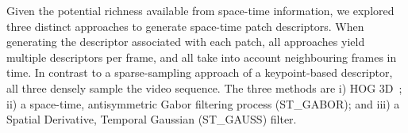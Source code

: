 

Given the potential richness available from space-time information, we explored three distinct approaches to generate space-time patch descriptors.  When generating the descriptor associated with each patch, all  approaches yield multiple descriptors per frame, and all take into account neighbouring frames in time.  In contrast to a sparse-sampling approach of a keypoint-based descriptor, all three densely sample the video sequence.  The three methods are i) HOG 3D~\cite{Klaser2008}; ii) a space-time, antisymmetric Gabor filtering process (ST\_GABOR); and iii) a Spatial Derivative, Temporal Gaussian (ST\_GAUSS) filter.\\

